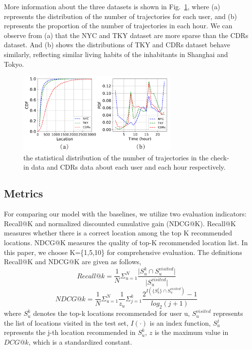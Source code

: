 \documentclass[10pt,journal,compsoc]{IEEEtran}
\begin{document}
More information about the three datasets is shown in Fig.~\ref{fig.10}, where (a) represents the distribution of the number of trajectories for each user, and (b) represents the proportion of the number of trajectories in each hour. We can observe from (a) that the NYC and TKY dataset are more sparse than the CDRs dataset. And (b) shows the distributions of TKY and CDRs dataset behave similarly, reflecting similar living habits of the inhabitants in Shanghai and Tokyo.

\begin{figure}[htpb]
    \centering
    \includegraphics[width=8cm]{figure/fig10.pdf}
    \caption{the statistical distribution of the number of trajectories in the check-in data and CDRs data about each user and each hour respectively.}
    \label{fig.10}
\end{figure}

\subsection{Metrics}
For comparing our model with the baselines, we utilize two evaluation indicators: Recall@K and normalized discounted cumulative gain (NDCG@K). Recall@K measures whether there is a correct location among the top K recommended locations. NDCG@K measures the quality of top-K recommended location list. In this paper, we choose K=\{1,5,10\} for comprehensive evaluation. The definitions Recall@K and NDCG@K are given as follows,
%
\begin{equation}
    Recall@k = \frac{1}{N}\Sigma^{N}_{u=1}\frac{\lvert{S^{k}_u}\cap{S^{visited}_{u}}\rvert}{\lvert{S^{visited}_{u}}\rvert}
\end{equation}
%
\begin{equation}
    NDCG@k = \frac{1}{N}\Sigma^{N}_{u=1}\frac{1}{z_u}\Sigma^{k}_{j=1}\frac{2^{I(\{S^{j}_{u}\}\cap{S^{visited}_{u}})}-1}{log_{2}(j+1)}
\end{equation}
where $S^{k}_u$ denotes the top-k locations recommended for user u, $S^{visited}_{u}$ represents the list of locations visited in the test set, $I(\cdot)$ is an index function, $S^{j}_{u}$ represents the j-th location recommended in $S^{k}_{u}$, $z$ is the maximum value in $DCG@k$, which is a standardized constant.
\end{document}
